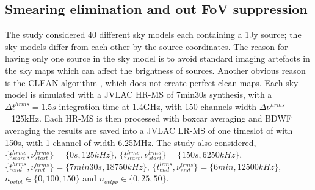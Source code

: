\documentclass[useAMS,usenatbib]{mn2e}
\begin{document}
\subsection{Smearing elimination and out FoV suppression}
The study considered $40$ different sky models each  containing a 1Jy source; the sky models differ from each other by the source 
coordinates. 
The reason for having  only one source in the sky model is to avoid standard imaging artefacts in the sky maps which 
can affect the brightness of sources. Another obvious reason is the  CLEAN algorithm \citep{cornwell1999deconvolution}, which does not 
create 
perfect clean maps. Each  sky model is simulated 
with a JVLAC HR-MS of 7min30s synthesis, with a $\Delta t^{hrms}=1.5s$ integration 
time at 1.4GHz,  with 150 channels width $\Delta \nu^{hrms}$=125kHz.  Each HR-MS is then processed with boxcar averaging and BDWF 
averaging the results are saved into a JVLAC LR-MS of one timeslot of with  150s,  with 1 channel of width 6.25MHz. The study also 
considered, $\{t^{hrms}_{start},\nu^{hrms}_{start}\}=\{0s,125kHz\}$, $\{t^{lrms}_{start},\nu^{lrms}_{start}\}=\{150s,6250kHz\}$, 
$\{t^{hrms}_{end},\nu^{hrms}_{end}\}=\{7min30s,18750kHz\}$, $\{t^{lrms}_{end},\nu^{lrms}_{end}\}=\{6min,12500kHz\}$, 
$n_{ovlpt}\in\{0,100,150\}$ 
and $n_{ovlp\nu}\in\{0,25,50\}$. 
\end{document}
